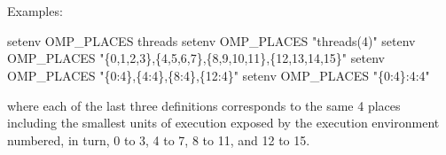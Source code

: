 \begin{bnf*}
    \\
    \\
    \\
    \\
    \\
    \\
    \\
    \\
    \\
    \\
    \\
    \\
\end{bnf*}

\pagebreak

\begin{samepage}
Examples:
\begin{boxedcode}
setenv OMP\_PLACES threads
setenv OMP\_PLACES "threads(4)"
setenv OMP\_PLACES "\{0,1,2,3\},\{4,5,6,7\},\{8,9,10,11\},\{12,13,14,15\}"
setenv OMP\_PLACES "\{0:4\},\{4:4\},\{8:4\},\{12:4\}"
setenv OMP\_PLACES "\{0:4\}:4:4"
\end{boxedcode}
\end{samepage}

where each of the last three definitions corresponds to the same 4 places including the 
smallest units of execution exposed by the execution environment numbered, in turn, 0 
to 3, 4 to 7, 8 to 11, and 12 to 15. 

